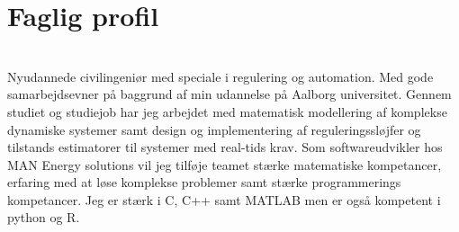 \documentclass[a4paper]{twentysecondcv} %
\begin{document}





\skillstext{}


\makeprofile %


\section{Faglig profil}\\[0.2cm]
Nyudannede civilingeniør med speciale i regulering og automation. Med gode samarbejdsevner på baggrund af min udannelse på Aalborg universitet. Gennem studiet og studiejob har jeg arbejdet med matematisk modellering af komplekse dynamiske systemer samt design og implementering af reguleringssløjfer og tilstands estimatorer til systemer med real-tids krav. Som softwareudvikler hos MAN Energy solutions vil jeg tilføje teamet stærke matematiske kompetancer, erfaring med at løse komplekse problemer samt stærke programmerings kompetancer. Jeg er stærk i C, C++ samt MATLAB men er også kompetent i python og R.
\end{document}
